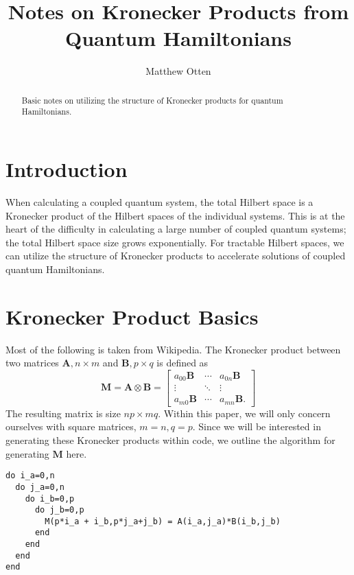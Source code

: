 \documentclass{article}
\begin{document}
\title{Notes on Kronecker Products from Quantum Hamiltonians}
\author{Matthew Otten}

\maketitle

\begin{abstract}
  Basic notes on utilizing the structure of Kronecker products for quantum Hamiltonians.
\end{abstract}

\section{Introduction}
When calculating a coupled quantum system, the total Hilbert space is a Kronecker product
of the Hilbert spaces of the individual systems. This is at the heart of the difficulty in
calculating a large number of coupled quantum systems; the total Hilbert space size
grows exponentially. For tractable Hilbert spaces, we can utilize the structure
of Kronecker products to accelerate solutions of coupled quantum Hamiltonians.

\section{Kronecker Product Basics}\label{basicprops}
Most of the following is taken from Wikipedia.
The Kronecker product between two matrices $\mathbf{A}, n \times m$ and $\mathbf{B}, p \times q$
is defined as
\begin{equation}
  \mathbf{M} = \mathbf{A}\otimes\mathbf{B} =
    \begin{bmatrix}
      a_{00} \mathbf{B} & \dotsm & a_{0n} \mathbf{B} \\
      \vdots & \ddots & \vdots \\
      a_{m0} \mathbf{B} & \dotsm & a_{mn} \mathbf{B}.
    \end{bmatrix}
\end{equation}
The resulting matrix is size $np \times mq$. Within this paper, we will only concern ourselves
with square matrices, $m=n, q=p$. Since we will be interested in generating these Kronecker products
within code, we outline the algorithm for generating $\mathbf{M}$ here.\\
\begin{minipage}{\linewidth}
\begin{verbatim}
do i_a=0,n
  do j_a=0,n
    do i_b=0,p
      do j_b=0,p
        M(p*i_a + i_b,p*j_a+j_b) = A(i_a,j_a)*B(i_b,j_b)
      end
    end
  end
end
\end{verbatim}
\end{minipage}\\
\end{document}
